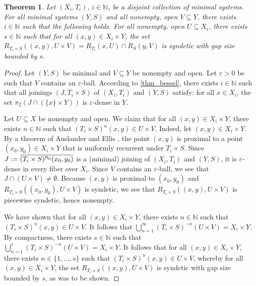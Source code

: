 \documentclass[letter,11pt]{article}
\theoremstyle{plain}
\newtheorem{theorem}{Theorem}
\theoremstyle{definition}
\theoremstyle{plain}
\theoremstyle{plain}
\numberwithin{equation}{section}
\newcommand{\eps}{\epsilon}
\newcommand{\N}{\mathbb{N}}
\newcommand{\defeq}{\vcentcolon=}
\renewcommand{\epsilon}{\varepsilon}
\begin{document}
\begin{theorem}
\label{thm_quantitative_strengthening_of_type_1_example}
    Let $(X_i,T_i)$, $i \in \N$, be a disjoint collection of minimal systems.  For all minimal systems $(Y,S)$ and all nonempty, open $V \subseteq Y$, there exists $i \in \N$ such that the following holds.  For all nonempty, open $U \subseteq X_i$, there exists $s \in \N$ such that for all $(x,y) \in X_i \times Y$, the set $R_{T_i \times S}((x,y), U \times V) = R_{T_i}(x,U) \cap R_S(y,V)$ is syndetic with gap size bounded by $s$.
\end{theorem}

\begin{proof}
    Let $(Y,S)$ be minimal and $V \subseteq Y$ be nonempty and open.  Let $\eps > 0$ be such that $V$ contains an $\eps$-ball.  According to \cref{thm_bessel}, there exists $i \in \N$ such that all joinings $(J,T_i \times S)$ of $(X_i,T_i)$ and $(Y,S)$ satisfy: for all $x \in X_i$, the set $\pi_2(J \cap (\{x\} \times Y))$ is $\eps$-dense in $Y$.

    Let $U \subseteq X$ be nonempty and open.  We claim that for all $(x,y) \in X_i \times Y$, there exists $n \in \N$ such that $(T_i \times S)^n (x,y) \in U \times V$.  Indeed, let $(x,y) \in X_i \times Y$. By a theorem of Auslander \cite{auslander_1960} and Ellis \cite{ellis_1957}, the point $(x,y)$ is proximal to a point $(x_0,y_0) \in X_i \times Y$ that is uniformly recurrent under $T_i \times S$.  Since $J \defeq \overline{(T_i \times S)^{\N_0}(x_0,y_0)}$ is a (minimal) joining of $(X_i,T_i)$ and $(Y,S)$, it is $\eps$-dense in every fiber over $X_i$.  Since $V$ contains an $\eps$-ball, we see that $J \cap (U \times V) \neq \emptyset$.  Because $(x,y)$ is proximal to $(x_0,y_0)$ and $R_{T_i \times S}((x_0,y_0), U \times V)$ is syndetic, we see that $R_{T_i \times S}((x,y),U \times V)$ is piecewise syndetic, hence nonempty.
    
    We have shown that for all $(x,y) \in X_i \times Y$, there exists $n \in \N$ such that $(T_i \times S)^n (x,y) \in U \times V$. It follows that $\bigcup_{n=1}^\infty (T_i \times S)^{-n} (U \times V) = X_i \times Y$.  By compactness, there exists $s \in \N$ such that $\bigcup_{n=1}^s (T_i \times S)^{-n} (U \times V) = X_i \times Y$. It follows that for all $(x,y) \in X_i \times Y$, there exists $n \in \{1, \ldots, s\}$ such that $(T_i \times S)^n(x,y) \in U \times V$, whereby for all $(x,y) \in X_i \times Y$, the set $R_{T_i \times S}((x,y), U\times V)$ is syndetic with gap size bounded by $s$, as was to be shown.
\end{proof}
\end{document}
